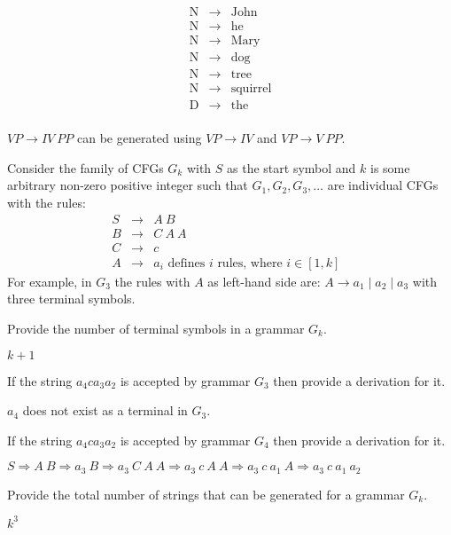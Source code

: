 \documentclass[12pt]{article}
\newcommand{\cfgrule}[2]{#1 & \rightarrow & #2 \nonumber}
\newcommand{\nlcfgrule}[2]{\textrm{#1} & \rightarrow & \textrm{#2} \nonumber}
\begin{document}
\begin{exe}
\begin{minipage}[t]{5cm}
\end{minipage}
\begin{minipage}[t]{5cm}
\begin{eqnarray*}
\nlcfgrule{N}{John}\\
\nlcfgrule{N}{he}\\
\nlcfgrule{N}{Mary}\\
\nlcfgrule{N}{dog}\\
\nlcfgrule{N}{tree}\\
\nlcfgrule{N}{squirrel}\\
\nlcfgrule{D}{the}\\
\end{eqnarray*}
\end{minipage}

\begin{soln}
$VP \rightarrow IV\ PP$ can be generated using $VP \rightarrow IV$ and $VP \rightarrow V\ PP$.
\end{soln}

\bigskip
\ex\label{derivs} Consider the family of CFGs $G_k$ with $S$ as the start symbol and $k$ is some arbitrary non-zero positive integer such that $G_1, G_2, G_3, \ldots$ are individual CFGs with the rules:
\begin{eqnarray*}
\cfgrule{S}{A\ B} \\
\cfgrule{B}{C\ A\ A} \\
\cfgrule{C}{c} \\
\cfgrule{A}{a_i \textrm{\ \ \ defines $i$ rules, where $i \in [1,k]$ }}
\end{eqnarray*}
For example, in $G_3$ the rules with $A$ as left-hand side are: $A \rightarrow a_1 \mid a_2 \mid a_3$ with three terminal symbols.

\begin{xlist}

{\ex Provide the number of terminal symbols in a grammar $G_k$.
\begin{soln}
$k+1$
\end{soln}
}

{\ex If the string $a_4 c a_3 a_2$ is accepted by grammar $G_3$ then provide a derivation for it.
\begin{soln}
$a_4$ does not exist as a terminal in $G_3$.
\end{soln}
}

{\ex If the string $a_4 c a_3 a_2$ is accepted by grammar $G_4$ then provide a derivation for it.
\begin{soln}
$S \Rightarrow A\ B \Rightarrow a_3\ B \Rightarrow a_3\ C\ A\ A \Rightarrow a_3\ c\ A\ A \Rightarrow a_3\ c\ a_1\ A \Rightarrow a_3\ c\ a_1\ a_2$
\end{soln}
}

{\ex Provide the total number of strings that can be generated for a grammar $G_k$.
\begin{soln}
$k^3$
\end{soln}
}

\end{xlist}


\end{exe}
\end{document}
